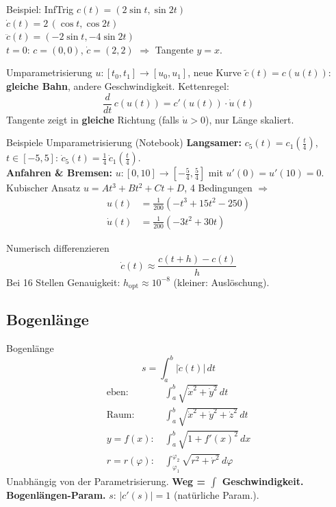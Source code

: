 \documentclass[a4paper, fontsize=7pt]{scrartcl}
\def\dx{\,dx}
\def\dt{\,dt}
\begin{document}
\begin{subbox}{Beispiel: InfTrig}
$c(t) = (2\sin t, \sin 2t)$\\
$\dot c(t) = 2\,(\cos t, \cos 2t)$\\
$\ddot c(t) = (-2\sin t, -4\sin 2t)$\\
$t = 0$: $c = (0, 0)$, $\dot c = (2, 2)$ $\Rightarrow$ Tangente $y = x$.
\end{subbox}

\begin{mainbox}{Umparametrisierung}
$u: [t_0, t_1] \to [u_0, u_1]$, neue Kurve $\tilde c(t) = c(u(t))$:
\textbf{gleiche Bahn}, andere Geschwindigkeit. Kettenregel:
$$\frac{d}{dt}\, c(u(t)) = c'(u(t)) \cdot \dot u(t)$$
Tangente zeigt in \textbf{gleiche} Richtung (falls $\dot u > 0$), nur
Länge skaliert.
\end{mainbox}

\begin{subbox}{Beispiele Umparametrisierung (Notebook)}
\textbf{Langsamer:} $c_5(t) = c_1(\frac{t}{4})$, $t \in [-5, 5]$:
$\dot c_5(t) = \frac{1}{4}\, \dot c_1(\frac{t}{4})$.\\[2pt]
\textbf{Anfahren \& Bremsen:} $u: [0, 10] \to [-\frac{5}{4}, \frac{5}{4}]$
mit $u'(0) = u'(10) = 0$. Kubischer Ansatz $u = At^3 + Bt^2 + Ct + D$,
4 Bedingungen $\Rightarrow$
\begin{align*}
u(t) &= \tfrac{1}{200}\left(-t^3 + 15t^2 - 250\right)\\
\dot u(t) &= \tfrac{1}{200}\left(-3t^2 + 30t\right)
\end{align*}
\end{subbox}

\begin{subbox}{Numerisch differenzieren}
$$\dot c(t) \approx \frac{c(t + h) - c(t)}{h}$$
Bei 16 Stellen Genauigkeit: $h_{\text{opt}} \approx 10^{-8}$ (kleiner:
Auslöschung).
\end{subbox}

\subsection{Bogenlänge}

\begin{mainbox}{Bogenlänge}
$$s = \int_a^b |\dot c(t)| \dt$$
\begin{align*}
\text{eben: } & \int_a^b \sqrt{\dot x^2 + \dot y^2} \dt\\
\text{Raum: } & \int_a^b \sqrt{\dot x^2 + \dot y^2 + \dot z^2} \dt\\
y = f(x)\text{: } & \int_a^b \sqrt{1 + f'(x)^2} \dx\\
r = r(\varphi)\text{: } & \int_{\varphi_1}^{\varphi_2}
  \sqrt{r^2 + \dot r^2}\, d\varphi
\end{align*}
Unabhängig von der Parametrisierung. \textbf{Weg = $\int$ Geschwindigkeit.}\\
\textbf{Bogenlängen-Param.} $s$: $|c'(s)| = 1$ (natürliche Param.).
\end{mainbox}
\end{document}
